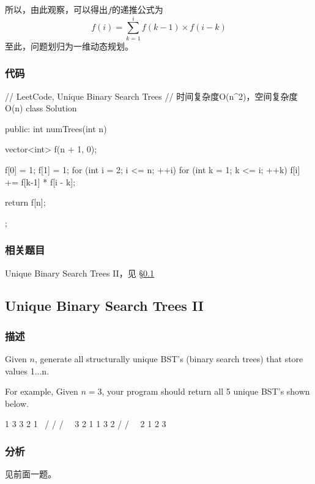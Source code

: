 所以，由此观察，可以得出$f$的递推公式为
$$
f(i) = \sum_{k=1}^{i} f(k-1) \times f(i-k)
$$
至此，问题划归为一维动态规划。


\subsubsection{代码}

\begin{Code}
// LeetCode, Unique Binary Search Trees
// 时间复杂度O(n^2)，空间复杂度O(n)
class Solution {
public:
    int numTrees(int n) {
        vector<int> f(n + 1, 0);

        f[0] = 1;
        f[1] = 1;
        for (int i = 2; i <= n; ++i) {
            for (int k = 1; k <= i; ++k)
                f[i] += f[k-1] * f[i - k];
        }

        return f[n];
    }
};
\end{Code}


\subsubsection{相关题目}
\begindot
\item Unique Binary Search Trees II，见 \S \ref{sec:unique-binary-search-trees-ii}
\myenddot


\subsection{Unique Binary Search Trees II}
\label{sec:unique-binary-search-trees-ii}


\subsubsection{描述}
Given $n$, generate all structurally unique BST's (binary search trees) that store values 1...n.

For example,
Given $n = 3$, your program should return all 5 unique BST's shown below.
\begin{Code}
   1         3     3      2      1
    \       /     /      / \      \
     3     2     1      1   3      2
    /     /       \                 \
   2     1         2                 3
\end{Code}


\subsubsection{分析}
见前面一题。


